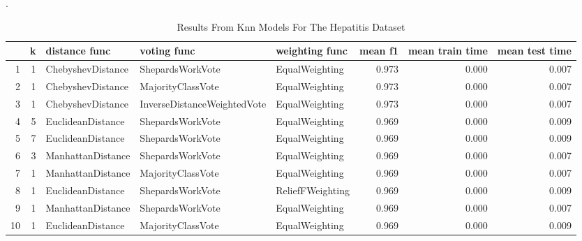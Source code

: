 .\begin{table}
\centering
\caption{Results From Knn Models For The Hepatitis Dataset}
\label{tab:knn_results_hepatitis}
\begin{tabular}{rrlllrrr}
\toprule
 & k & distance func & voting func & weighting func & mean f1 & mean train time & mean test time \\
\midrule
1 & 1 & ChebyshevDistance & ShepardsWorkVote & EqualWeighting & 0.973 & 0.000 & 0.007 \\
2 & 1 & ChebyshevDistance & MajorityClassVote & EqualWeighting & 0.973 & 0.000 & 0.007 \\
3 & 1 & ChebyshevDistance & InverseDistanceWeightedVote & EqualWeighting & 0.973 & 0.000 & 0.007 \\
4 & 5 & EuclideanDistance & ShepardsWorkVote & EqualWeighting & 0.969 & 0.000 & 0.009 \\
5 & 7 & EuclideanDistance & ShepardsWorkVote & EqualWeighting & 0.969 & 0.000 & 0.009 \\
6 & 3 & ManhattanDistance & ShepardsWorkVote & EqualWeighting & 0.969 & 0.000 & 0.007 \\
7 & 1 & ManhattanDistance & MajorityClassVote & EqualWeighting & 0.969 & 0.000 & 0.007 \\
8 & 1 & EuclideanDistance & ShepardsWorkVote & ReliefFWeighting & 0.969 & 0.000 & 0.009 \\
9 & 1 & ManhattanDistance & ShepardsWorkVote & EqualWeighting & 0.969 & 0.000 & 0.007 \\
10 & 1 & EuclideanDistance & MajorityClassVote & EqualWeighting & 0.969 & 0.000 & 0.009 \\
\bottomrule
\end{tabular}
\end{table}
